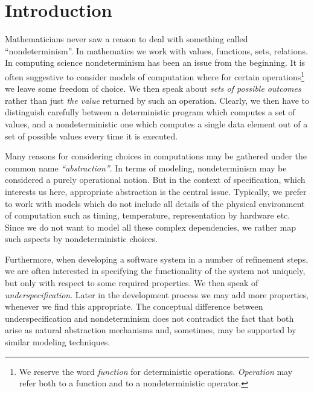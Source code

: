\section{Introduction}
Mathematicians never saw a reason to deal with something called ``nondeterminism''. In mathematics we work with values, functions, sets, relations.
In computing science nondeterminism has been an issue from the beginning. 
It is often suggestive to consider models of computation where for certain operations\footnote{We reserve the word {\em function} for deterministic operations. {\em Operation} may refer both to a function and
to a nondeterministic operator.} we leave some freedom of choice. We then speak
about {\em sets of possible outcomes} rather than just {\em the value} returned
by
such an operation. Clearly, we then have to distinguish carefully between a deterministic program which computes a set of values, and a nondeterministic one which computes a single data element out of a set of possible values every time it is executed. 

Many reasons for considering choices in computations may be gathered under the
common name {\em ``abstraction''}. In terms of modeling, nondeterminism may be considered a purely operational notion. But in the context of specification,
which interests us here, appropriate abstraction is the central issue. Typically, we prefer to
work with models which do not include all details of the physical environment of computation such as timing, temperature, representation by hardware etc. Since
we do not want to model all these complex dependencies, we rather map such aspects by nondeterministic choices. 

Furthermore, when developing a software system in a number of refinement steps,
we are often interested in specifying the functionality of the system not uniquely,
but only with respect to some required properties. We then speak of {\em underspecification}. Later in the development process we may add more properties, whenever we find this appropriate. The conceptual difference between underspecification and nondeterminism does not
contradict the fact that both arise as natural abstraction mechanisms and, sometimes, may be supported by similar modeling techniques. 

